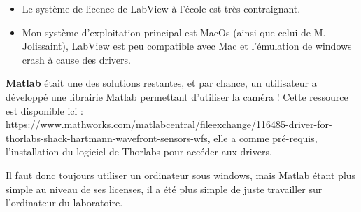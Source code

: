 \begin{itemize}
    \item Le système de licence de LabView à l'école est très contraignant.
    \item Mon système d'exploitation principal est MacOs (ainsi que celui de M. Jolissaint), LabView est peu compatible avec Mac et l'émulation de windows crash à cause des drivers.
\end{itemize}

\textbf{Matlab} était une des solutions restantes, et par chance, un utilisateur a développé une librairie Matlab permettant d'utiliser la caméra ! Cette ressource est disponible ici :
\url{https://www.mathworks.com/matlabcentral/fileexchange/116485-driver-for-thorlabs-shack-hartmann-wavefront-sensors-wfs}, elle a comme pré-requis, l'installation du logiciel de Thorlabs pour accéder aux drivers.

Il faut donc toujours utiliser un ordinateur sous windows, mais Matlab étant plus simple au niveau de ses licenses, il a été plus simple de juste travailler sur l'ordinateur du laboratoire.
